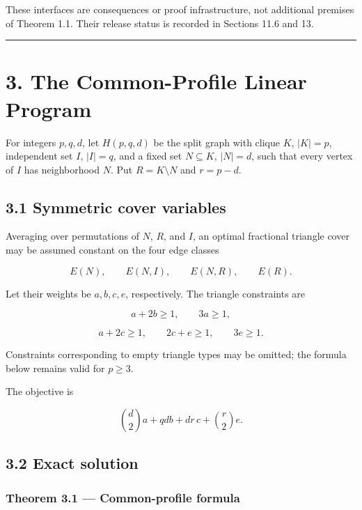 \documentclass[
  american,
  11pt,
  a4paper,
]{article}
\begin{document}
These interfaces are consequences or proof infrastructure, not additional premises of Theorem 1.1. Their release status is recorded in Sections 11.6 and 13.

\begin{center}\rule{0.5\linewidth}{0.5pt}\end{center}

\section{3. The Common-Profile Linear Program}\label{the-common-profile-linear-program}

For integers \(p,q,d\), let \(H(p,q,d)\) be the split graph with clique \(K\), \(|K|=p\), independent set \(I\), \(|I|=q\), and a fixed set \(N\subseteq K\), \(|N|=d\), such that every vertex of \(I\) has neighborhood \(N\). Put \(R=K\setminus N\) and \(r=p-d\).

\subsection{3.1 Symmetric cover variables}\label{symmetric-cover-variables}

Averaging over permutations of \(N\), \(R\), and \(I\), an optimal fractional triangle cover may be assumed constant on the four edge classes

\[
E(N),
\qquad E(N,I),
\qquad E(N,R),
\qquad E(R).
\]

Let their weights be \(a,b,c,e\), respectively. The triangle constraints are

\[
a+2b\ge1,
\qquad
3a\ge1,
\tag{3.1}
\]

\[
a+2c\ge1,
\qquad
2c+e\ge1,
\qquad
3e\ge1.
\tag{3.2}
\]

Constraints corresponding to empty triangle types may be omitted; the formula below remains valid for \(p\ge3\).

The objective is

\[
\binom d2a+qdb+dr\,c+\binom r2e.
\tag{3.3}
\]

\subsection{3.2 Exact solution}\label{exact-solution}

\subsubsection{Theorem 3.1 --- Common-profile formula}\label{theorem-3.1-common-profile-formula}
\end{document}
